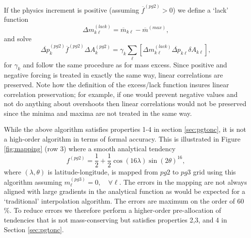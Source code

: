 \documentclass{agujournal}
\begin{document}
If the physics increment is positive (assuming ${\overline{f}}^{(pg2)}>0$) we define a `lack' function
\begin{equation}
\Delta m^{(lack)}_{k\ell}=\overline{m}_{k\ell}-\overline{m}^{(max)},
\end{equation}
and solve
\begin{equation}
\label{eq:mass-lack}
\overline{\Delta p}_k^{(pg2)}{\overline{f}}^{(pg2)}\Delta A_k^{(pg2)}=\gamma_k \sum_\ell \left[ \Delta m^{(lack)}_{k\ell}\overline{\Delta p}_{k\ell} \delta A_{k\ell}\right],
\end{equation}
for $\gamma_k$ and follow the same procedure as for mass excess. Since positive and negative forcing is treated in exactly the same way, linear correlations are preserved. Note how the definition of the excess/lack function insures linear correlation preservation; for example, if one would prevent negative values and not do anything about overshoots then linear correlations would not be preserved since the minima and maxima are not treated in the same way.

While the above algorithm satisfies properties 1-4 in section \ref{sec:pgtonc}, it is not a high-order algorithm in terms of formal accuracy. This is illustrated in Figure \ref{fig:mapping} (row 3) where a smooth analytical tendency \citep[approximate spherical harmonic of order 32 and azimuthal wave number 16; ][]{J1999MWR}
\begin{equation}
\label{eq:Y32}
f^{(pg2)}=\frac{1}{2}+\frac{1}{2}\cos(16\lambda)\sin(2\theta)^{16},
\end{equation}
where $(\lambda,\theta)$ is latitude-longitude, is mapped from $pg2$ to $pg3$ grid using this algorithm assuming $m^{(pg3)}_\ell=0, \quad \forall \ell$. The errors in the mapping are not always aligned with large gradients in the analytical function as would be expected for a `traditional' interpolation algorithm. The errors are maximum on the order of 60$\%$. To reduce errors we therefore perform a higher-order pre-allocation of tendencies that is not mass-conserving but satisfies properties 2,3, and 4 in Section \ref{sec:pgtonc}.
\end{document}

